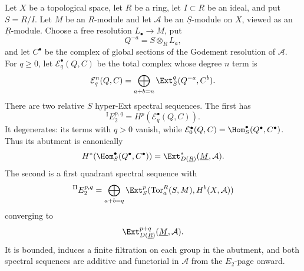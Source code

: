 \begin{lemma}
\label{lemma-constant-sheaf-ext-quotient-spectral-sequence}
\begin{reference}
\cite[Chapter IV, \S 4.3, p. 192]{Tohoku}
\end{reference}
Let $X$ be a topological space, let $R$ be a ring, let $I \subset R$ be
an ideal, and put $S = R/I$. Let $M$ be an $R$-module and let
$\mathcal{A}$ be an $\underline{S}$-module on $X$, viewed as an
$\underline{R}$-module. Choose a free resolution $L_\bullet \to M$, put
$$
Q^{-a} = S \otimes_R L_a,
$$
and let $C^\bullet$ be the complex of global sections of the Godement
resolution of $\mathcal{A}$. For $q \geq 0$, let
$\mathcal{E}_q^\bullet(Q, C)$ be the total complex whose degree $n$ term is
$$
\mathcal{E}_q^n(Q, C) =
\bigoplus_{a + b = n}\Ext_S^q(Q^{-a}, C^b).
$$
There are two relative $S$ hyper-Ext spectral sequences. The first has
$$
{}^{\mathrm I}E_2^{p, q} = H^p(\mathcal{E}_q^\bullet(Q, C)).
$$
It degenerates: its terms with $q > 0$ vanish, while
$\mathcal{E}_0^\bullet(Q, C) = \Hom_S^\bullet(Q^\bullet, C^\bullet)$.
Thus its abutment is canonically
$$
H^*(\Hom_S^\bullet(Q^\bullet, C^\bullet)) =
\Ext^*_{D(\underline{R})}(\underline{M}, \mathcal{A}).
$$
The second is a first quadrant spectral sequence with
$$
{}^{\mathrm{II}}E_2^{p, q} =
\bigoplus_{a + b = q}
\Ext_S^p(\text{Tor}_a^R(S, M), H^b(X, \mathcal{A}))
$$
converging to
$$
\Ext^{p + q}_{D(\underline{R})}(\underline{M}, \mathcal{A}).
$$
It is bounded, induces a finite filtration on each group in the
abutment, and both spectral sequences are additive and functorial in
$\mathcal{A}$ from the $E_2$-page onward.
\end{lemma}

